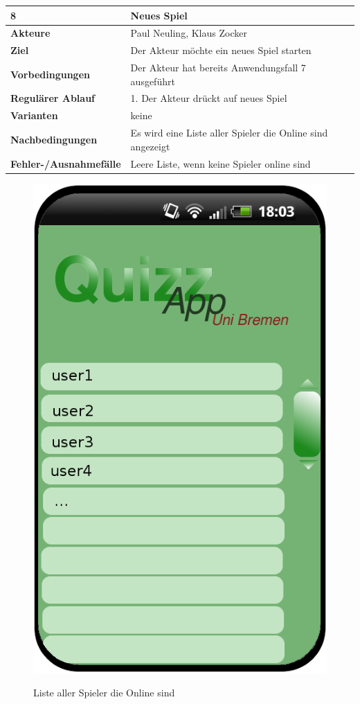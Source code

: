 \documentclass[fontsize=12pt,paper=a4,twoside]{scrartcl}
\begin{document}
\begin{table}
	[H] \label{8} 
	\begin{tabular}
		{|l|p{10cm}|} \hline \textbf{8} & \textbf{Neues Spiel} \\
		\hline \textbf{Akteure} & Paul Neuling, Klaus Zocker\\
		\hline \textbf{Ziel} & Der Akteur möchte ein neues Spiel starten\\
		\hline \textbf{Vorbedingungen} & Der Akteur hat bereits Anwendungsfall 7 ausgeführt \\
		\hline \textbf{Regulärer Ablauf} & 1. Der Akteur drückt auf neues Spiel \\
		\hline \textbf{Varianten} & keine \\
		\hline \textbf{Nachbedingungen} & Es wird eine Liste aller Spieler die Online sind angezeigt\\
		\hline \textbf{Fehler-/Ausnahmefälle} & Leere Liste, wenn keine Spieler online sind \\
		\hline 
	\end{tabular}
\end{table}

\begin{figure}
	[H] \caption{Liste aller Spieler die Online sind} 
	\includegraphics[width=0.5
	\textwidth]{Bilder/QuizzListeSpielerOnline.png} \label{pic:que} 
\end{figure}
\end{document}
